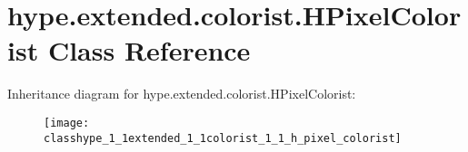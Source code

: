 \hypertarget{classhype_1_1extended_1_1colorist_1_1_h_pixel_colorist}{\section{hype.\-extended.\-colorist.\-H\-Pixel\-Colorist Class Reference}
\label{classhype_1_1extended_1_1colorist_1_1_h_pixel_colorist}
}
Inheritance diagram for hype.\-extended.\-colorist.\-H\-Pixel\-Colorist\-:\begin{figure}[H]
\begin{center}
\leavevmode
\texttt{[image: classhype\_1\_1extended\_1\_1colorist\_1\_1\_h\_pixel\_colorist]}
\end{center}
\end{figure}
